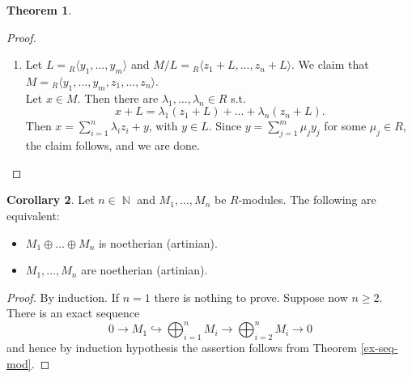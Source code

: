 \documentclass[12pt,a4paper]{report}
\theoremstyle{definition}
\newtheorem{theorem}{Theorem}[chapter] %
\newtheorem{corollary}[theorem]{Corollary} %
\theoremstyle{num.custom-title}
\newenvironment{claim}[1]{\par\noindent\underline{Claim#1:}\space}{} %
\newenvironment{claimproof}[1]{\par\noindent\underline{Proof:}\space#1}{\leavevmode\unskip\penalty9999 \hbox{}\nobreak\hfill\quad\hbox{$\blacksquare$}} %
\DeclareMathOperator{\N}{\mathbb{N}}
\DeclareMathOperator{\sse}{\subseteq}
\begin{document}
\begin{theorem}
\begin{proof}
\begin{enumerate}
\begin{claim}{}
$I_j = I_k$ for all $j \geq k := \max\{k',k''\}$.
\begin{claimproof}
Suppose $j \geq k$. Then $I_k \sse I_j$. We have to show that $I_j \sse I_k$. Let $x \in I_j$. Then $\pi(x) = x+L \in I_j/L = I_k/L$. So $x = a+b$ for some $a \in L$, $b \in I_k$. Thus $a = x-b \in L \cap I_j = L \cap I_k \sse I_k$, which implies $x = a+b \in I_k$.
\end{claimproof}
\end{claim}\\
So $M$ is noetherian.
\\[6pt]
For artinian modules, the proof runs along the same lines.
\item Let $L = {}_R \langle y_1,...,y_m \rangle$ and $M/L = {}_R \langle z_1+L,...,z_n+L \rangle$. We claim that $M = {}_R \langle y_1,...,y_m,z_1,...,z_n \rangle$.\\
Let $x \in M$. Then there are $\lambda_1,...,\lambda_n \in R$ s.t.
\[
x+L = \lambda_1 (z_1+L) + \ldots + \lambda_n(z_n+L).
\]
Then $x = \sum_{i=1}^n \lambda_i z_i + y$, with $y \in L$. Since $y = \sum_{j=1}^m \mu_j y_j$ for some $\mu_j \in R$, the claim follows, and we are done.
\end{enumerate}
\end{proof}
\end{theorem}

\begin{corollary}\label{char_direct-sum_noeth}
Let $n \in \N$ and $M_1,...,M_n$ be $R$-modules. The following are equivalent:
\begin{itemize}
\item $M_1 \oplus \ldots \oplus M_n$ is noetherian (artinian).
\item $M_1, \ldots, M_n$ are noetherian (artinian).
\end{itemize}
\begin{proof}
By induction. If $n=1$ there is nothing to prove. Suppose now $n \geq 2$. There is an exact sequence
\[
0 \to M_1 \hookrightarrow \bigoplus_{i=1}^n M_i \to \bigoplus_{i=2}^n M_i \to 0
\]
and hence by induction hypothesis the assertion follows from Theorem \ref{ex-seq-mod}.
\end{proof}
\end{corollary}
\end{document}
